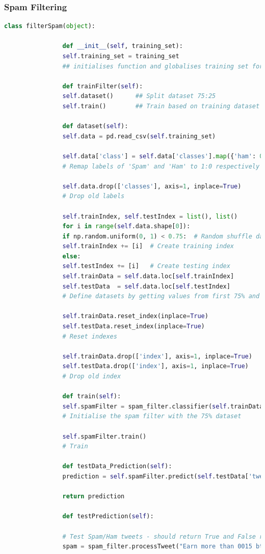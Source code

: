 \documentclass[oneside, 12pt]{article}
\begin{document}
			\subsubsection{Spam Filtering}
				\begin{lstlisting}[language=python, caption=Spam filter training Class]
				class filterSpam(object):
				
				def __init__(self, training_set):
				self.training_set = training_set	
				## initialises function and globalises training set for use in every function where needed
				
				def trainFilter(self):
				self.dataset()		## Split dataset 75:25
				self.train()		## Train based on training dataset
				
				def dataset(self):
				self.data = pd.read_csv(self.training_set)
				
				self.data['class'] = self.data['classes'].map({'ham': 0, 'spam': 1})
				# Remap labels of 'Spam' and 'Ham' to 1:0 respectively
				
				self.data.drop(['classes'], axis=1, inplace=True)
				# Drop old labels
				
				self.trainIndex, self.testIndex = list(), list()
				for i in range(self.data.shape[0]):
				if np.random.uniform(0, 1) < 0.75:	# Random shuffle data of 75%
				self.trainIndex += [i]	# Create training index
				else:
				self.testIndex += [i]	# Create testing index
				self.trainData = self.data.loc[self.trainIndex]
				self.testData  = self.data.loc[self.testIndex]
				# Define datasets by getting values from first 75% and then 25%
				
				self.trainData.reset_index(inplace=True)
				self.testData.reset_index(inplace=True)		
				# Reset indexes
				
				self.trainData.drop(['index'], axis=1, inplace=True)
				self.testData.drop(['index'], axis=1, inplace=True)
				# Drop old index
				
				def train(self):
				self.spamFilter = spam_filter.classifier(self.trainData)
				# Initialise the spam filter with the 75% dataset
				
				self.spamFilter.train()
				# Train
				
				def testData_Prediction(self):
				prediction = self.spamFilter.predict(self.testData['tweet'])
				
				return prediction
				
				def testPrediction(self):
				
				# Test Spam/Ham tweets - should return True and False respectivly
				spam = spam_filter.processTweet("Earn more than 0015 btc free No deposit No investment Free Bitcoins - Earn $65 free btc in 5 minutes bitcoin freebtc getbtc")
				

\end{lstlisting}
\end{document}
